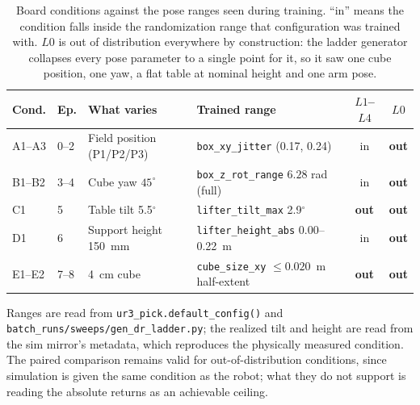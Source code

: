 \begin{table}[h]
\centering
\caption{Board conditions against the pose ranges seen during training. \enquote{in} means the condition falls inside the randomization range that configuration was trained with. $L0$ is out of distribution everywhere by construction: the ladder generator collapses every pose parameter to a single point for it, so it saw one cube position, one yaw, a flat table at nominal height and one arm pose.}
\label{tab:coverage}
\begin{tabular}{llllcc}
\hline
\textbf{Cond.} & \textbf{Ep.} & \textbf{What varies} & \textbf{Trained range} & \textbf{$L1$--$L4$} & \textbf{$L0$} \\
\hline
A1--A3 & 0--2 & Field position (P1/P2/P3) & \texttt{box\_xy\_jitter} (0.17, 0.24) & in & \textbf{out} \\
B1--B2 & 3--4 & Cube yaw $45^\circ$ & \texttt{box\_z\_rot\_range} $6.28$ rad (full) & in & \textbf{out} \\
C1 & 5 & Table tilt 5.5$^\circ$ & \texttt{lifter\_tilt\_max} 2.9$^\circ$ & \textbf{out} & \textbf{out} \\
D1 & 6 & Support height 150~mm & \texttt{lifter\_height\_abs} 0.00--0.22~m & in & \textbf{out} \\
E1--E2 & 7--8 & 4~cm cube & \texttt{cube\_size\_xy} $\leq0.020$~m half-extent & \textbf{out} & \textbf{out} \\
\hline
\end{tabular}

\vspace{2pt}
\begin{minipage}{0.95\linewidth}
\footnotesize Ranges are read from \texttt{ur3\_pick.default\_config()} and \texttt{batch\_runs/sweeps/gen\_dr\_ladder.py}; the realized tilt and height are read from the sim mirror's metadata, which reproduces the physically measured condition. The paired comparison remains valid for out-of-distribution conditions, since simulation is given the same condition as the robot; what they do not support is reading the absolute returns as an achievable ceiling.
\end{minipage}
\end{table}

